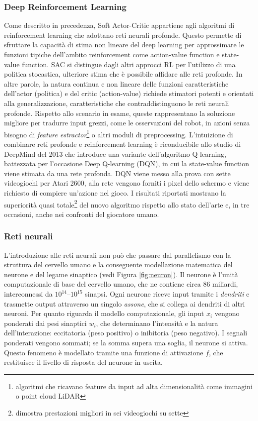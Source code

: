 \subsubsection{Deep Reinforcement Learning}
Come descritto in precedenza, Soft Actor-Critic appartiene agli algoritmi di reinforcement learning che adottano reti neurali profonde. Questo permette di sfruttare la capacità di stima non lineare del deep learning per approssimare le funzioni tipiche dell'ambito reinforcement come action-value function e state-value function. SAC si distingue dagli altri approcci RL per l'utilizzo di una politica stocastica, ulteriore stima che è possibile affidare alle reti profonde. In altre parole, la natura continua e non lineare delle funzioni caratteristiche dell'actor (politica) e del critic (action-value) richiede stimatori potenti e orientati alla generalizzazione, caratteristiche che contraddistinguono le reti neurali profonde. Rispetto allo scenario in esame, queste rappresentano la soluzione migliore per tradurre input grezzi, come le osservazioni del robot, in azioni senza bisogno di \textit{feature estractor}\footnote{algoritmi che ricavano feature da input ad alta dimensionalità come immagini o point cloud LiDAR} o altri moduli di preprocessing. L'intuizione di combinare reti profonde e reinforcement learning è riconducibile allo studio di DeepMind del 2013 \cite{mnih2013playing} che introduce una variante dell'algoritmo Q-learning, battezzata per l'occasione Deep Q-learning (DQN), in cui la state-value function viene stimata da una rete profonda. DQN viene messo alla prova con sette videogiochi per Atari 2600, alla rete vengono forniti i pixel dello schermo e viene richiesto di compiere un'azione nel gioco. I risultati riportati mostrano la superiorità quasi totale\footnote{dimostra prestazioni migliori in sei videogiochi su sette} del nuovo algoritmo rispetto allo stato dell'arte e, in tre occasioni, anche nei confronti del giocatore umano. 

\subsubsection{Reti neurali}
L'introduzione alle reti neurali non può che passare dal parallelismo con la struttura del cervello umano e la conseguente modellazione matematica del neurone e del legame sinaptico (vedi Figura \ref{fig:neuron}). Il neurone è l’unità computazionale di base del cervello umano, che ne contiene circa 86 miliardi, interconnessi da $10^{14}$–$10^{15}$ sinapsi. Ogni neurone riceve input tramite i \textit{dendriti} e trasmette output attraverso un singolo \textit{assone}, che si collega ai dendriti di altri neuroni. Per quanto riguarda il modello computazionale, gli input $x_i$ vengono ponderati dai pesi sinaptici $w_i$, che determinano l’intensità e la natura dell’interazione: eccitatoria (peso positivo) o inibitoria (peso negativo). I segnali ponderati vengono sommati; se la somma supera una soglia, il neurone si attiva. Questo fenomeno è modellato tramite una funzione di attivazione $f$, che restituisce il livello di risposta del neurone in uscita. 

